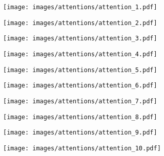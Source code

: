 \documentclass[10pt,twocolumn,letterpaper]{article}
\begin{document}
\begin{figure*}
    \centering
    \begin{subfigure}[t]{0.32\textwidth}
        \texttt{[image: images/attentions/attention\_1.pdf]}
        \caption{}
        \label{fig:attention_1}
    \end{subfigure}
    \begin{subfigure}[t]{0.32\textwidth}
        \texttt{[image: images/attentions/attention\_2.pdf]}
        \caption{}
        \label{fig:attention_2}
    \end{subfigure}
        \begin{subfigure}[t]{0.32\textwidth}
        \texttt{[image: images/attentions/attention\_3.pdf]}
        \caption{}
        \label{fig:attention_3}
    \end{subfigure}
    \begin{subfigure}[t]{0.32\textwidth}
        \texttt{[image: images/attentions/attention\_4.pdf]}
        \caption{}
        \label{fig:attention_4}
    \end{subfigure}
    \begin{subfigure}[t]{0.32\textwidth}
        \texttt{[image: images/attentions/attention\_5.pdf]}
        \caption{}
        \label{fig:attention_5}
    \end{subfigure}
    \begin{subfigure}[t]{0.32\textwidth}
        \texttt{[image: images/attentions/attention\_6.pdf]}
        \caption{}
        \label{fig:attention_6}
    \end{subfigure}
    \begin{subfigure}[t]{0.32\textwidth}
        \texttt{[image: images/attentions/attention\_7.pdf]}
        \caption{}
        \label{fig:attention_7}
    \end{subfigure}
        \begin{subfigure}[t]{0.32\textwidth}
        \texttt{[image: images/attentions/attention\_8.pdf]}
        \caption{}
        \label{fig:attention_8}
    \end{subfigure}
    \begin{subfigure}[t]{0.32\textwidth}
        \texttt{[image: images/attentions/attention\_9.pdf]}
        \caption{}
        \label{fig:attention_9}
    \end{subfigure}
    \begin{subfigure}[t]{0.32\textwidth}
        \texttt{[image: images/attentions/attention\_10.pdf]}

\end{subfigure}
\end{figure*}
\end{document}

